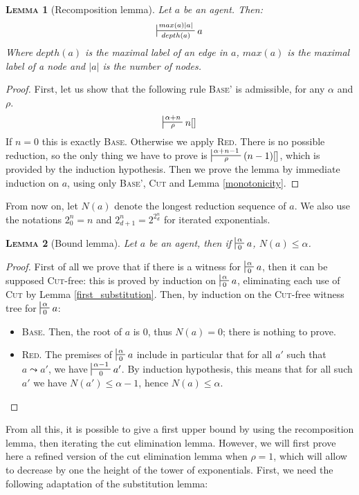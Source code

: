\documentclass{article}
\newtheorem{lemma}{\textsc{Lemma}}
\begin{document}
\begin{lemma}[Recomposition lemma]
Let $a$ be an agent. Then:
\[
\sststile{depth(a)}{max(a)|a|} a
\]
Where $depth(a)$ is the maximal label of an edge in $a$, $max(a)$ is the maximal label of a node and $|a|$ is the number of nodes.
\end{lemma}
\begin{proof}
First, let us show that the following rule \textsc{Base'} is admissible, for any $\alpha$ and $\rho$.
\[
\sststile{\rho}{\alpha + n} n[]
\]
If $n=0$ this is exactly \textsc{Base}. Otherwise we apply \textsc{Red}. There is no possible reduction, so the only thing we have to prove is $\sststile{\rho}{\alpha + n - 1} (n-1)[]$, which
is provided by the induction hypothesis. Then we prove the lemma by immediate induction on $a$, using only \textsc{Base'}, \textsc{Cut} and Lemma \ref{monotonicity}.
\end{proof}

From now on, let $N(a)$ denote the longest reduction sequence of $a$. We also use the notations $2_0^n = n$ and $2_{d+1}^n = 2^{{2_d^n}}$ for iterated exponentials.

\begin{lemma}[Bound lemma]
Let $a$ be an agent, then if $\sststile{0}{\alpha} a$, $N(a) \leq \alpha$.
\label{bound}
\end{lemma}
\begin{proof}
First of all we prove that if there is a witness for $\sststile{0}{\alpha} a$, then it can be supposed \textsc{Cut}-free: this is proved by induction on $\sststile{0}{\alpha} a$, eliminating
each use of \textsc{Cut} by Lemma \ref{first_substitution}. Then, by induction on the \textsc{Cut}-free witness tree for $\sststile{0}{\alpha} a$:
\begin{itemize}
\item \textsc{Base.} Then, the root of $a$ is $0$, thus $N(a) = 0$; there is nothing to prove.
\item \textsc{Red.} The premises of $\sststile{0}{\alpha} a$ include in particular that for all $a'$ such that $a\leadsto a'$, we have $\sststile{0}{\alpha-1} a'$. By induction hypothesis, this
means that for all such $a'$ we have $N(a') \leq \alpha-1$, hence $N(a) \leq \alpha$.
\end{itemize}
\end{proof}

From all this, it is possible to give a first upper bound by using the recomposition lemma, then iterating the cut elimination lemma. However, we will first prove here a refined version of the
cut elimination lemma when $\rho=1$, which will allow to decrease by one the height of the tower of exponentials. First, we need the following adaptation of the substitution lemma:
\end{document}
